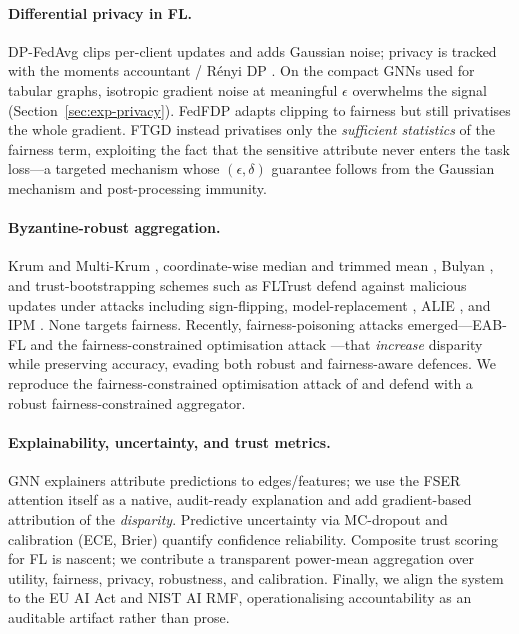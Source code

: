 \paragraph{Differential privacy in FL.}
DP-FedAvg \cite{mcmahan2018learning} clips per-client updates and adds Gaussian
noise; privacy is tracked with the moments accountant / R\'enyi DP
\cite{mironov2017renyi,abadi2016deep}. On the compact GNNs used for tabular
graphs, isotropic gradient noise at meaningful $\epsilon$ overwhelms the signal
(Section~\ref{sec:exp-privacy}). FedFDP \cite{ling2024feddp} adapts clipping to
fairness but still privatises the whole gradient. FTGD instead privatises only
the \emph{sufficient statistics} of the fairness term, exploiting the fact that
the sensitive attribute never enters the task loss---a targeted mechanism whose
$(\epsilon,\delta)$ guarantee follows from the Gaussian mechanism and
post-processing immunity.

\paragraph{Byzantine-robust aggregation.}
Krum and Multi-Krum \cite{blanchard2017krum}, coordinate-wise median and
trimmed mean \cite{yin2018byzantine}, Bulyan \cite{mhamdi2018hidden}, and
trust-bootstrapping schemes such as FLTrust \cite{cao2021fltrust} defend
against malicious updates under attacks including sign-flipping,
model-replacement \cite{bagdasaryan2020backdoor}, ALIE \cite{baruch2019little},
and IPM \cite{xie2019fall}. None targets fairness. Recently, fairness-poisoning
attacks emerged---EAB-FL \cite{eabfl2024} and the fairness-constrained
optimisation attack \cite{kasyap2025attack}---that \emph{increase} disparity
while preserving accuracy, evading both robust and fairness-aware defences. We
reproduce the fairness-constrained optimisation attack of
\cite{kasyap2025attack} and defend with a robust fairness-constrained
aggregator.

\paragraph{Explainability, uncertainty, and trust metrics.}
GNN explainers attribute predictions to edges/features; we use the FSER
attention itself as a native, audit-ready explanation and add gradient-based
attribution of the \emph{disparity}. Predictive uncertainty via MC-dropout
\cite{gal2016dropout} and calibration (ECE, Brier) quantify confidence
reliability. Composite trust scoring for FL is nascent; we contribute a
transparent power-mean aggregation over utility, fairness, privacy, robustness,
and calibration. Finally, we align the system to the EU AI Act and NIST AI RMF,
operationalising accountability as an auditable artifact rather than prose.

